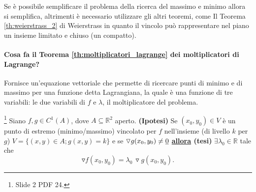 Se è possibile semplificare il problema della ricerca del massimo e minimo allora si semplifica, altrimenti è necessario utilizzare gli altri teoremi, come Il Teorema \ref{th:weierstrass_2} di Weierstrass in quanto il vincolo può rappresentare nel piano un insieme limitato e chiuso (un compatto).

\paragraph{Cosa fa il Teorema \ref{th:moltiplicatori_lagrange} dei moltiplicatori di Lagrange?} Fornisce un'equazione vettoriale che permette di ricercare punti di minimo e di massimo per una funzione detta Lagrangiana, la quale è una funzione di tre variabili: le due variabili di $f$ e $\lambda$, il moltiplicatore del problema.

\begin{theorem}\label{th:moltiplicatori_lagrange}\footnote{Slide 2 PDF 24.}
	Siano $f,g\in C^1(A)$, dove $A\subseteq\mathbb{R}^2$ aperto. \textbf{(Ipotesi)} Se $(x_0,y_0)\in V$ è un punto di estremo (minimo/massimo) vincolato per $f$ nell'insieme (di livello $k$ per $g$) $V=\{(x,y)\in A; g(x,y)= k\}$ e se $\triangledown g(x_0,y_0)\neq\uline 0$ \textbf{\ul{allora} (tesi)} $\exists \lambda_0\in\mathbb{R}$ tale che
	\begin{equation}\label{eq:identita_vettoriale_moltiplicatore_lagrange}
		\triangledown f(x_0,y_0)=\lambda_0\, \triangledown g(x_0, y_0).
	\end{equation}
\end{theorem}

